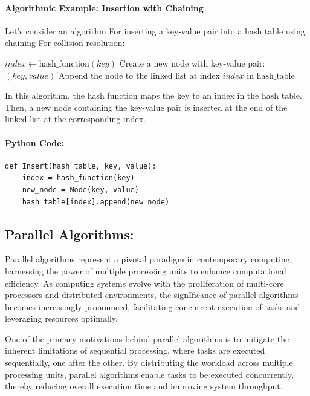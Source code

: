 \documentclass[12pt]{book} %
\begin{document}
\paragraph{Algorithmic Example: Insertion with Chaining}

Let's consider an algorithm For inserting a key-value pair into a hash table using chaining For collision resolution:

\begin{algorithm}
\caption{Insertion with Chaining}
\begin{algorithmic}[1]
    \State $index \gets \text{hash\_function}(key)$
    \State Create a new node with key-value pair: $(key, value)$
    \State Append the node to the linked list at index $index$ in $\text{hash\_table}$
\EndFunction
\end{algorithmic}
\end{algorithm}

In this algorithm, the hash function maps the key to an index in the hash table. Then, a new node containing the key-value pair is inserted at the end of the linked list at the corresponding index.
\paragraph{Python Code: }
\begin{verbatim}
def Insert(hash_table, key, value):
    index = hash_function(key)
    new_node = Node(key, value)
    hash_table[index].append(new_node)
\end{verbatim}


\subsection{Parallel Algorithms:}

Parallel algorithms represent a pivotal paradigm in contemporary computing, harnessing the power of multiple processing units to enhance computational efficiency. As computing systems evolve with the prolIferation of multi-core processors and distributed environments, the signIficance of parallel algorithms becomes increasingly pronounced, facilitating concurrent execution of tasks and leveraging resources optimally.

One of the primary motivations behind parallel algorithms is to mitigate the inherent limitations of sequential processing, where tasks are executed sequentially, one after the other. By distributing the workload across multiple processing units, parallel algorithms enable tasks to be executed concurrently, thereby reducing overall execution time and improving system throughput.
\end{document}
